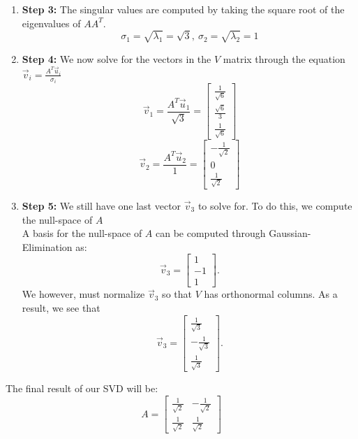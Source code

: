 \begin{enumerate}
{\begin{enumerate}[label=(\roman*)]
        A basis for the null-space of $AA^{T} - I$ is:
        $$\vec{u}_{2} = \begin{bmatrix} -\frac{1}{\sqrt{2}} \\ \frac{1}{\sqrt{2}} \end{bmatrix}$$
        Remember that these vectors form the $U$ matrix.
      \item \textbf{Step 3:}
        The singular values are computed by taking the square root of the eigenvalues of $AA^{T}.$
        $$\sigma_{1} = \sqrt{\lambda_{1}} = \sqrt{3}, \ \sigma_{2} = \sqrt{\lambda_{2}} = 1$$
      \item \textbf{Step 4:}
        We now solve for the vectors in the $V$ matrix through the equation $\vec{v}_i = \frac{A^{T} \vec{u}_i}{\sigma_i}$
        $$\vec{v}_{1} = \frac{A^{T} \vec{u}_{1}}{\sqrt{3}} = 
        \begin{bmatrix} \frac{1}{\sqrt{6}} \\ \frac{\sqrt{6}}{3} \\ \frac{1}{\sqrt{6}} \end{bmatrix}$$
        $$\vec{v}_{2} = \frac{A^{T} \vec{u}_{2}}{1} = 
        \begin{bmatrix} -\frac{1}{\sqrt{2}} \\ 0 \\ \frac{1}{\sqrt{2}} \end{bmatrix}$$
      \item \textbf{Step 5:}
        We still have one last vector $\vec{v}_{3}$ to solve for. To do this, we compute the null-space of $A$ \\
        A basis for the null-space of $A$ can be computed through Gaussian-Elimination as:
        $$\vec{v}_{3} = \begin{bmatrix} 1 \\ -1 \\ 1 \end{bmatrix}.$$
        We however, must normalize $\vec{v}_{3}$ so that $V$ has orthonormal columns. As a result, we see that
        $$\vec{v}_{3} = \begin{bmatrix} \frac{1}{\sqrt{3}} \\ - \frac{1}{\sqrt{3}} \\ \frac{1}{\sqrt{3}} \end{bmatrix}.$$
    \end{enumerate}
    The final result of our SVD will be:
    \begin{equation}
      A = \begin{bmatrix} \frac{1}{\sqrt{2}} & -\frac{1}{\sqrt{2}} \\ \frac{1}{\sqrt{2}} & \frac{1}{\sqrt{2}} \end{bmatrix} 

\end{equation}}
\end{enumerate}
